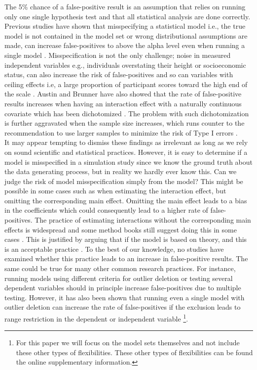 The 5\% chance of a false-positive result is an assumption that relies on running only one single hypothesis test and that all statistical analysis are done correctly. Previous studies have shown that misspecifying a statistical model i.e., the true model is not contained in the model set or wrong distributional assumptions are made, can increase false-positives to above the alpha level even when running a single model \citep{Dennis2019,litiere2007}. Misspecification is not the only challenge; noise in measured independent variables e.g., individuals overstating their height or socioeconomic status, can also increase the risk of false-positives \citep{Brunner2009} and so can variables with ceiling effects i.e, a large proportion of participant scores toward the high end of the scale \citep{Austin2003}. Austin and Brunner have also showed that the rate of false-positive results increases when having an interaction effect with a naturally continuous covariate which has been dichotomized \citep{Austin2004}. The problem with such dichotomization is further aggravated when the sample size increases, which runs counter to the recommendation to use larger samples to minimize the risk of Type I errors \citep{simmons2018}. 
\\
It may appear tempting to dismiss these findings as irrelevant as long as we rely on sound scientific and statistical practices. However, it is easy to determine if a model is misspecified in a simulation study since we know the ground truth about the data generating process, but in reality we hardly ever know this. Can we judge the risk of model misspecification simply from the model? This might be possible in some cases such as when estimating the interaction effect, but omitting the corresponding main effect. Omitting the main effect leads to a bias in the coefficients \citep{Branbor2006} which could consequently lead to a higher rate of false-positives. The practice of estimating interactions without the corresponding main effects is widespread \citep{Branbor2006} and some method books still suggest doing this in some cases \citep{Cleves2008}. This is justified by arguing that if the model is based on theory, and this is an acceptable practice \citep{aiken1991multiple}. To the best of our knowledge, no studies have examined whether this practice leads to an increase in false-positive results. The same could be true for many other common research practices. For instance, running models using different criteria for outlier deletion or testing several dependent variables should in principle increase false-positives due to multiple testing. However, it has also been shown that running even a single model with outlier deletion can increase the rate of false-positives if the exclusion leads to range restriction in the dependent or independent variable \citep{Raju2003}\footnote{For this paper we will focus on the model sets themselves and not include these other types of flexibilities. These other types of flexibilities can be found the online supplementary information.}.  \\        

